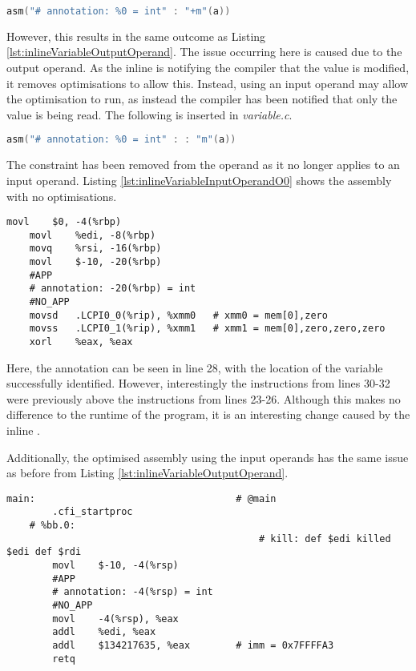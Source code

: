 \begin{lstlisting}[language=C, numbers=none]
asm("# annotation: %0 = int" : "+m"(a))
\end{lstlisting}

However, this results in the same outcome as Listing \ref{lst:inlineVariableOutputOperand}. The issue occurring here is caused due to the output operand. As the inline  is notifying the compiler that the value is modified, it removes optimisations to allow this. Instead, using an input operand may allow the optimisation to run, as instead the compiler has been notified that only the value is being read. The following  is inserted in \textit{variable.c}.

\begin{lstlisting}[language=C, numbers=none]
asm("# annotation: %0 = int" : : "m"(a))
\end{lstlisting}

The  constraint has been removed from the operand as it no longer applies to an input operand. Listing \ref{lst:inlineVariableInputOperandO0} shows the assembly with no optimisations.

\begin{lstlisting}[firstnumber=23, caption=variable-O0.s, label=lst:inlineVariableInputOperandO0]
	movl	$0, -4(%rbp)
	movl	%edi, -8(%rbp)
	movq	%rsi, -16(%rbp)
	movl	$-10, -20(%rbp)
	#APP
	# annotation: -20(%rbp) = int
	#NO_APP
	movsd	.LCPI0_0(%rip), %xmm0   # xmm0 = mem[0],zero
	movss	.LCPI0_1(%rip), %xmm1   # xmm1 = mem[0],zero,zero,zero
	xorl	%eax, %eax
\end{lstlisting}

Here, the annotation can be seen in line 28, with the location of the variable successfully identified. However, interestingly the instructions from lines 30-32 were previously above the instructions from lines 23-26. Although this makes no difference to the runtime of the program, it is an interesting change caused by the inline . 

Additionally, the optimised assembly using the input operands has the same issue as before from Listing \ref{lst:inlineVariableOutputOperand}.

\begin{lstlisting}[firstnumber=6, caption=variable-O3.s]
    main:                                   # @main
        .cfi_startproc
    # %bb.0:
                                            # kill: def $edi killed $edi def $rdi
        movl	$-10, -4(%rsp)
        #APP
        # annotation: -4(%rsp) = int
        #NO_APP
        movl	-4(%rsp), %eax
        addl	%edi, %eax
        addl	$134217635, %eax        # imm = 0x7FFFFA3
        retq
\end{lstlisting}

